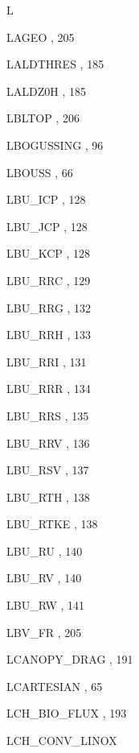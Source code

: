 \begin{theindex}
  \indexspace
L
  \item LAGEO
    \subitem {},  205
  \item LALDTHRES
    \subitem {},  185
  \item LALDZ0H
    \subitem {},  185
  \item LBLTOP
    \subitem {},  206
  \item LBOGUSSING
    \subitem {},  96
  \item LBOUSS
    \subitem {},  66
  \item LBU\_ICP
    \subitem {},  128
  \item LBU\_JCP
    \subitem {},  128
  \item LBU\_KCP
    \subitem {},  128
  \item LBU\_RRC
    \subitem {},  129
  \item LBU\_RRG
    \subitem {},  132
  \item LBU\_RRH
    \subitem {},  133
  \item LBU\_RRI
    \subitem {},  131
  \item LBU\_RRR
    \subitem {},  134
  \item LBU\_RRS
    \subitem {},  135
  \item LBU\_RRV
    \subitem {},  136
  \item LBU\_RSV
    \subitem {},  137
  \item LBU\_RTH
    \subitem {},  138
  \item LBU\_RTKE
    \subitem {},  138
  \item LBU\_RU
    \subitem {},  140
  \item LBU\_RV
    \subitem {},  140
  \item LBU\_RW
    \subitem {},  141
  \item LBV\_FR
    \subitem {},  205
  \item LCANOPY\_DRAG
    \subitem {},  191
  \item LCARTESIAN
    \subitem {},  65
  \item LCH\_BIO\_FLUX
    \subitem {},  193
  \item LCH\_CONV\_LINOX

\end{theindex}
